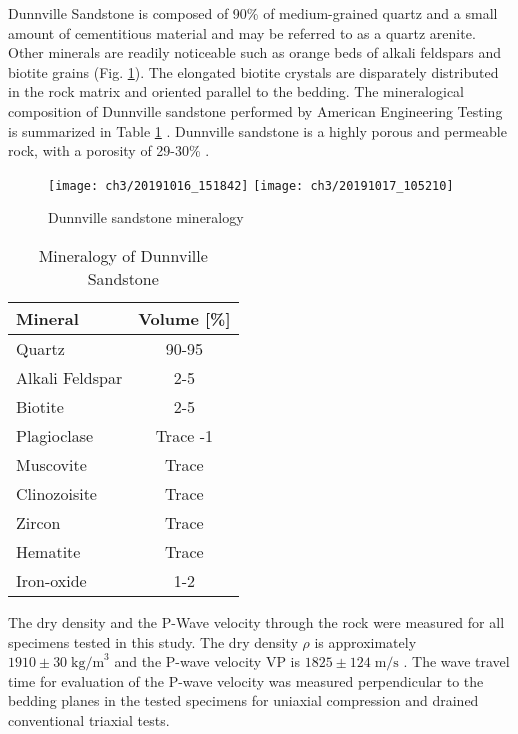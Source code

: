 Dunnville Sandstone is composed of 90\% of medium-grained quartz and a small amount of cementitious material and may be referred to as a quartz arenite. Other minerals are readily noticeable such as orange beds of alkali feldspars and biotite grains (Fig. \ref{fig3:1}). The elongated biotite crystals are disparately distributed in the rock matrix and oriented parallel to the bedding. The mineralogical composition of Dunnville sandstone performed by American Engineering Testing is summarized in Table \ref{tb3:mineralogy} \cite{Tarokh2016}. Dunnville sandstone is a highly porous and permeable rock, with a porosity of 29-30\% \cite{Tarokh2016}.

\begin{figure}[tb]
    \centering
    \texttt{[image: ch3/20191016\_151842]}
    \texttt{[image: ch3/20191017\_105210]}
    \caption{Dunnville sandstone mineralogy}
    \label{fig3:1}
\end{figure} 

\begin{table}[h]
    \centering
    \begin{tabular}{lc} \hline
        Mineral & Volume [\%] \\ \hline \hline
        Quartz & 90-95 \\ 
        Alkali Feldspar & 2-5 \\ 
        Biotite & 2-5 \\ 
        Plagioclase & Trace -1 \\ 
        Muscovite & Trace \\ 
        Clinozoisite & Trace \\ 
        Zircon & Trace \\ 
        Hematite & Trace \\ 
        Iron-oxide & 1-2 \\ \hline
    \end{tabular}
    \caption{Mineralogy of Dunnville Sandstone \cite{Tarokh2016}}
    \label{tb3:mineralogy}
\end{table}





The dry density and the P-Wave velocity through the rock were measured for all specimens tested in this study. The dry density $\rho$ is approximately $1910 \pm 30 \; \text{kg/m}^3$ and the P-wave velocity VP is $1825\pm 124 \; \text{m/s}$ . The wave travel time for evaluation of the P-wave velocity was measured perpendicular to the bedding planes in the tested specimens for uniaxial compression and drained conventional triaxial tests.

